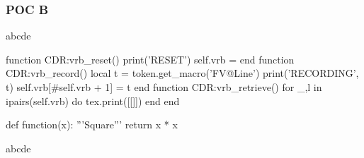 \subsubsection{POC B}
\bgroup
abcde
\makeatletter
\begin{luacode}
  function CDR:vrb_reset()
    print('RESET')
    self.vrb = {}
  end
  function CDR:vrb_record()
    local t = token.get_macro('FV@Line')
    print('RECORDING', t)
    self.vrb[\string#self.vrb + 1] = t
  end
  function CDR:vrb_retrieve()
    for _,l in ipairs(self.vrb) do
      tex.print([[\string\CDR@Line\string{]]..l..[[\string}]])
    end
  end
\end{luacode}
\ExplSyntaxOn
\def\CDR@Line#1{\CDR_line_box:nnn { } {#1} { } }
\def\FVB@POCCodeBoxB {
  \@bsphack
  \group_begin:
  \directlua{CDR:vrb_reset()}
  \cs_set:Npn \FV@ProcessLine ##1 {
    \directlua{CDR.vrb_record(CDR)}
  }
  \FV@Scan
}
\def\FVE@POCCodeBoxB {
  \codebox{POC B}
  \fvset{commandchars=\\\{\}}
  \FV@VerbatimBegin
  \makeatletter
  \directlua{CDR.vrb_retrieve(CDR)}
  \makeatother
  \cs_set_eq:NN \FV@ProcessLine \use:n
  \FV@VerbatimEnd
  \endcodebox
  \group_end:
  \@esphack
}
\ExplSyntaxOff
{}
\makeatother
\begin{POCCodeBoxB}
def function(x):
  '''Square'''
  return x * x
\end{POCCodeBoxB}
abcde
\egroup
